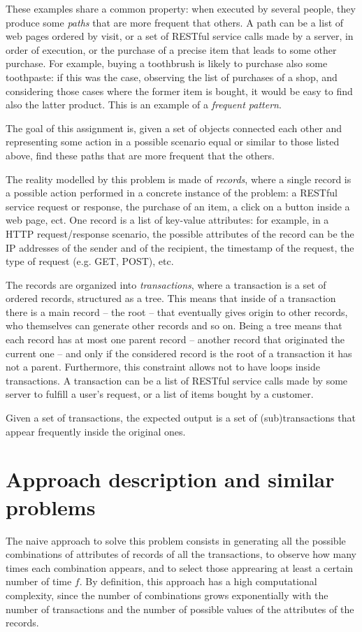 \documentclass{acm_proc_article-sp-sigmod09}
\begin{document}
These examples share a common property: when executed by several people, they produce some \emph{paths} that are more frequent that others. A path can be a list of web pages ordered by visit, or a set of RESTful service calls made by a server, in order of execution, or the purchase of a precise item that leads to some other purchase. For example, buying a toothbrush is likely to purchase also some toothpaste: if this was the case, observing the list of purchases of a shop, and considering those cases where the former item is bought, it would be easy to find also the latter product. This is an example of a \emph{frequent pattern}.

The goal of this assignment is, given a set of objects connected each other and representing some action in a possible scenario equal or similar to those listed above, find these paths that are more frequent that the others. 

The reality modelled by this problem is made of \emph{records}, where a single record is a possible action performed in a concrete instance of the problem: a RESTful service request or response, the purchase of an item, a click on a button inside a web page, ect. One record is a list of key-value attributes: for example, in a HTTP request/response scenario, the possible attributes of the record can be the IP addresses of the sender and of the recipient, the timestamp of the request, the type of request (e.g. GET, POST), etc. 

The records are organized into \emph{transactions}, where a transaction is a set of ordered records, structured as a tree. This means that inside of a transaction there is a main record -- the root -- that eventually gives origin to other records, who themselves can generate other records and so on. Being a tree means that each record has at most one parent record -- another record that originated the current one -- and only if the considered record is the root of a transaction it has not a parent. Furthermore, this constraint allows not to have loops inside transactions. A transaction can be a list of RESTful service calls made by some server to fulfill a user's request, or a list of items bought by a customer.

Given a set of transactions, the expected output is a set of (sub)transactions that appear frequently inside the original ones.

\section{Approach description and similar problems}
\label{sec:general}
The naive approach to solve this problem consists in generating all the possible combinations of attributes of records of all the transactions, to observe how many times each combination appears, and to select those apprearing at least a certain number of time $f$. By definition, this approach has a high computational complexity, since the number of combinations grows exponentially with the number of transactions and the number of possible values of the attributes of the records.
\end{document}
